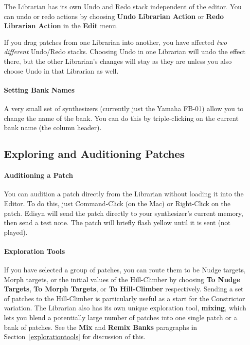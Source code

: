 \documentclass{article}
\begin{document}
The Librarian has its own Undo and Redo stack independent of the editor.  You can undo or redo actions by choosing {\bf Undo Librarian Action} or {\bf Redo Librarian Action} in the {\bf Edit} menu.

If you drag patches from one Librarian into another, you have affected {\it two different} Undo/Redo stacks.  Choosing Undo in one Librarian will undo the effect there, but the other Librarian's changes will stay as they are unless you also choose Undo in that Librarian as well.

\paragraph{Setting Bank Names}  A very small set of synthesizers (currently just the Yamaha FB-01) allow you to change the name of the bank.  You can do this by triple-clicking on the current bank name (the column header).

\subsection{Exploring and Auditioning Patches} 

\paragraph{Auditioning a Patch}

You can audition a patch directly from the Librarian without loading it into the Editor.  To do this, just Command-Click (on the Mac) or Right-Click on the patch.  Edisyn will send the patch directly to your synthesizer's current memory, then send a test note. The patch will briefly flash yellow until it is sent (not played).

\paragraph{Exploration Tools} If you have selected a group of patches, you can route them to be Nudge targets, Morph targets, or the initial values of the Hill-Climber by choosing {\bf To Nudge Targets}, {\bf To Morph Targets}, or {\bf To Hill-Climber} respectively.     Sending a set of patches to the Hill-Climber is particularly useful as a start for the Constrictor variation.  The Librarian also has its own unique exploration tool, {\bf mixing}, which lets you blend a potentially large number of patches into one single patch or a bank of patches.  See the {\bf Mix} and {\bf Remix Banks} paragraphs in Section~\ref{explorationtools} for discussion of this.
\end{document}
